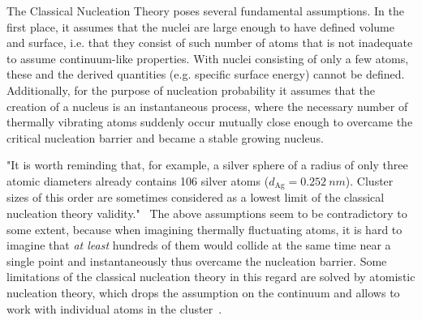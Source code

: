 The Classical Nucleation Theory poses several fundamental assumptions. In the first place, it assumes that the nuclei are large enough to have defined volume and surface, i.e. that they consist of such number of atoms that is not inadequate to assume continuum-like properties. With nuclei consisting of only a few atoms, these and the derived quantities (e.g. specific surface energy) cannot be defined. Additionally, for the purpose of nucleation probability it assumes that the creation of a nucleus is an instantaneous process, where the necessary number of thermally vibrating atoms suddenly occur mutually close enough to overcame the critical nucleation barrier and became a stable growing nucleus. 

"It is worth reminding that, for example, a silver sphere of a radius of only three atomic diameters already contains 106 silver atoms ($d_{\mathrm{Ag}} = \qty{0.252}{nm}$). Cluster sizes of this order are sometimes considered as a lowest limit of the classical nucleation theory validity."~\cite{Milchev2008} The above assumptions seem to be contradictory to some extent, because when imagining thermally fluctuating atoms, it is hard to imagine that \textit{at least} hundreds of them would collide at the same time near a single point and instantaneously thus overcame the nucleation barrier. Some limitations of the classical nucleation theory in this regard are solved by atomistic nucleation theory, which drops the assumption on the continuum and allows to work with individual atoms in the cluster~\cite{Kozlov2003, Milchev2008}.




